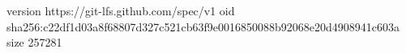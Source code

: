 version https://git-lfs.github.com/spec/v1
oid sha256:c22df1d03a8f68807d327c521cb63f9e0016850088b92068e20d4908941c603a
size 257281
